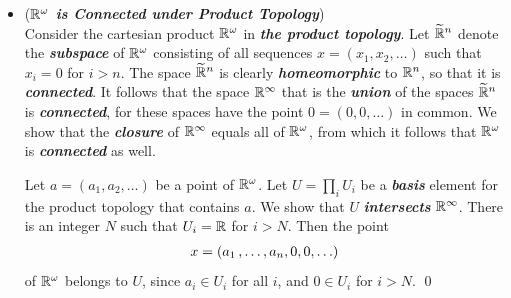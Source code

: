 \documentclass[11pt]{article}
\begin{document}
\begin{itemize}
\item \begin{example} (\emph{\textbf{${\mathbb R}^{\omega}$ is  Connected under Product Topology}})\\
Consider the cartesian product ${\mathbb R}^{\omega}$ in \emph{\textbf{the product topology}}. Let $\widetilde{{\mathbb R}}^n$ denote the \emph{\textbf{subspace}} of ${\mathbb R}^{\omega}$ consisting of all sequences $x = (x_1, x_2, \ldots)$ such that $x_i = 0$ for $i > n$. The space $\widetilde{{\mathbb R}}^n$  is clearly
\emph{\textbf{homeomorphic}} to ${\mathbb R}^n$, so that it is \emph{\textbf{connected}}. It follows that the space ${\mathbb R}^{\infty}$ that is the \emph{\textbf{union}} of the spaces $\widetilde{{\mathbb R}}^n$ is \emph{\textbf{connected}}, for these spaces have the point $0 = (0, 0, \ldots)$ in common.  We show that the \emph{\textbf{closure}} of ${\mathbb R}^{\infty}$ equals all of ${\mathbb R}^{\omega}$, from which it follows that ${\mathbb R}^{\omega}$ is \emph{\textbf{connected}} as well. 

Let $a = (a_1, a_2, \ldots)$ be a point of ${\mathbb R}^{\omega}$. Let $U = \prod_i U_i$ be a \emph{\textbf{basis}} element for the product topology that contains $a$. We show that $U$ \emph{\textbf{intersects}} ${\mathbb R}^{\infty}$. There is an integer $N$ such that $U_i = {\mathbb R}$ for $i > N$. Then the point
\begin{align*}
x = (a_1 \,{,}\ldots{,}\, a_n, 0, 0, \ldots)
\end{align*}
of ${\mathbb R}^{\omega}$ belongs to $U$, since $a_i \in U_i$ for all $i$, and $0 \in U_i$ for $i > N$. \qed
\end{example}
\end{itemize}
\end{document}
